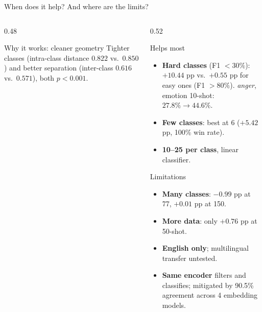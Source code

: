 \begin{frame}[t]{When does it help? And where are the limits?}
\begin{columns}[T]
\begin{column}{0.48\textwidth}
\vspace{0.3em}
\begin{block}{Why it works: cleaner geometry}
\scriptsize
Tighter classes (intra-class distance $0.822$ vs.\ $0.850$) and better separation
(inter-class $0.616$ vs.\ $0.571$), both $p<0.001$.
\end{block}
\end{column}
\begin{column}{0.52\textwidth}
\begin{block}{Helps most}
\footnotesize
\begin{itemize}\setlength\itemsep{0pt}
  \item \textbf{Hard classes} (F1 $<30\%$): $+10.44$ pp vs.\ $+0.55$ pp for easy ones (F1 $>80\%$).
        \emph{anger}, emotion 10-shot: $27.8\% \to 44.6\%$.
  \item \textbf{Few classes}: best at 6 ($+5.42$ pp, 100\% win rate).
  \item \textbf{10--25 per class}, linear classifier.
\end{itemize}
\end{block}

\begin{block}{Limitations}
\footnotesize
\begin{itemize}\setlength\itemsep{0pt}
  \item \textbf{Many classes}: $-0.99$ pp at 77, $+0.01$ pp at 150.
  \item \textbf{More data}: only $+0.76$ pp at 50-shot.
  \item \textbf{English only}; multilingual transfer untested.
  \item \textbf{Same encoder} filters and classifies; mitigated by 90.5\% agreement
        across 4 embedding models.
\end{itemize}
\end{block}
\end{column}
\end{columns}
\end{frame}

